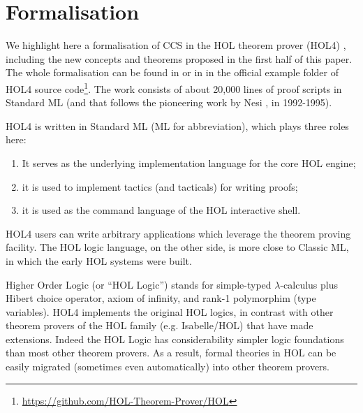 \section{Formalisation}
\label{s:for}
We highlight here a formalisation of CCS
in the HOL theorem
prover (HOL4) \cite{slind2008brief},
including the new concepts and theorems proposed in the first half of
this paper.
The whole formalisation can be found 
in \cite{Tian:2017wrba}  or in 
 in the official example folder of HOL4 source
code\footnote{\url{https://github.com/HOL-Theorem-Prover/HOL}}. The
work consists of about 20,000 lines of proof scripts in Standard ML
(and that follows the pioneering work by Nesi \cite{Nesi:1992ve}, in
1992-1995). 

HOL4 is written in Standard ML (ML for abbreviation), which plays three roles here:
\begin{enumerate}
\item It serves as the underlying implementation language for the core HOL engine;
\item it is used to implement tactics (and tacticals) for writing proofs;
\item it is used as the command language of the HOL interactive shell.
\end{enumerate}
HOL4 users can write arbitrary applications which leverage
the theorem proving facility. 
\iflong
The HOL logic language, on the other
 side, is more close to Classic ML, in which the early HOL systems were built.
\fi

Higher Order Logic (or ``HOL Logic'') \cite{hollogic} stands for simple-typed $\lambda$-calculus plus Hibert
choice operator, axiom of infinity, and rank-1 polymorphim (type
variables). HOL4 implements the original HOL logics, 
in contrast with 
 other theorem provers of the HOL family (e.g. Isabelle/HOL) that have
made extensions.
Indeed the HOL Logic has considerability simpler logic
foundations than most other theorem provers. %
As a result,
formal theories in HOL can be easily migrated (sometimes even
automatically) into other theorem provers.


